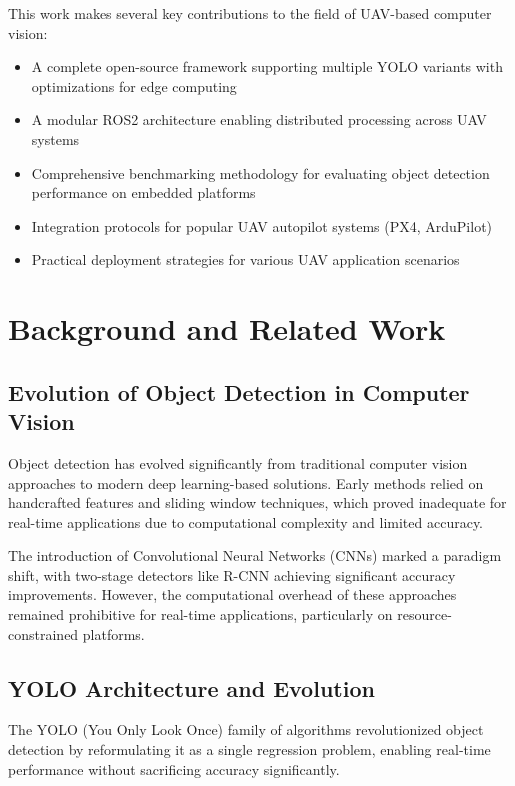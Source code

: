 \documentclass[12pt,a4paper]{article}
\begin{document}
This work makes several key contributions to the field of UAV-based computer vision:

\begin{itemize}[itemsep=0.5em]
    \item A complete open-source framework supporting multiple YOLO variants with optimizations for edge computing
    \item A modular ROS2 architecture enabling distributed processing across UAV systems
    \item Comprehensive benchmarking methodology for evaluating object detection performance on embedded platforms
    \item Integration protocols for popular UAV autopilot systems (PX4, ArduPilot)
    \item Practical deployment strategies for various UAV application scenarios
\end{itemize}

\section{Background and Related Work}

\subsection{Evolution of Object Detection in Computer Vision}

Object detection has evolved significantly from traditional computer vision approaches to modern deep learning-based solutions. Early methods relied on handcrafted features and sliding window techniques, which proved inadequate for real-time applications due to computational complexity and limited accuracy.

The introduction of Convolutional Neural Networks (CNNs) marked a paradigm shift, with two-stage detectors like R-CNN achieving significant accuracy improvements. However, the computational overhead of these approaches remained prohibitive for real-time applications, particularly on resource-constrained platforms.

\subsection{YOLO Architecture and Evolution}

The YOLO (You Only Look Once) family of algorithms revolutionized object detection by reformulating it as a single regression problem, enabling real-time performance without sacrificing accuracy significantly.
\end{document}
